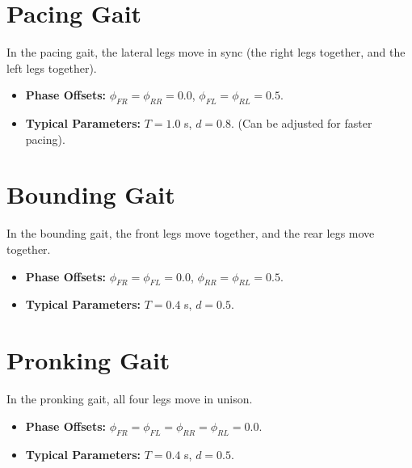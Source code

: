 \documentclass[11pt,a4paper]{report}
\begin{document}
\section{Pacing Gait}
In the pacing gait, the lateral legs move in sync (the right legs together, and the left legs together). 
\begin{itemize}
    \item \textbf{Phase Offsets:} $\phi_{FR}=\phi_{RR}=0.0$, $\phi_{FL}=\phi_{RL}=0.5$.
    \item \textbf{Typical Parameters:} $T = 1.0$ s, $d = 0.8$. (Can be adjusted for faster pacing).
\end{itemize}

\section{Bounding Gait}
In the bounding gait, the front legs move together, and the rear legs move together.
\begin{itemize}
    \item \textbf{Phase Offsets:} $\phi_{FR}=\phi_{FL}=0.0$, $\phi_{RR}=\phi_{RL}=0.5$.
    \item \textbf{Typical Parameters:} $T = 0.4$ s, $d = 0.5$.
\end{itemize}

\section{Pronking Gait}
In the pronking gait, all four legs move in unison.
\begin{itemize}
    \item \textbf{Phase Offsets:} $\phi_{FR}=\phi_{FL}=\phi_{RR}=\phi_{RL}=0.0$.
    \item \textbf{Typical Parameters:} $T = 0.4$ s, $d = 0.5$.
\end{itemize}
\end{document}
